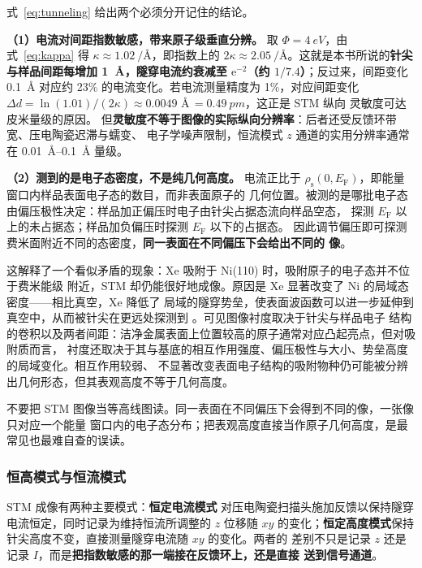 式~\eqref{eq:tunneling} 给出两个必须分开记住的结论。

\textbf{（1）电流对间距指数敏感，带来原子级垂直分辨。} 取 $\Phi=\qty{4}{eV}$，由
式~\eqref{eq:kappa} 得 $\kappa\approx\qty{1.02}{\per\angstrom}$，即指数上的
$2\kappa\approx\qty{2.05}{\per\angstrom}$。这就是本书所说的\textbf{针尖与样品间距每增加
\qty{1}{\angstrom}，隧穿电流约衰减至 $\mathrm{e}^{-2}$（约 $1/7.4$）}；反过来，间距变化
\qty{0.1}{\angstrom} 对应约 23\% 的电流变化。若电流测量精度为 1\%，对应间距变化
$\Delta d=\ln(1.01)/(2\kappa)\approx0.0049$ \AA$\,=\qty{0.49}{pm}$，这正是 STM 纵向
灵敏度可达皮米量级的原因。
但\textbf{灵敏度不等于图像的实际纵向分辨率}：后者还受反馈环带宽、压电陶瓷迟滞与蠕变、
电子学噪声限制，恒流模式 $z$ 通道的实用分辨率通常在 \qtyrange{0.01}{0.1}{\angstrom} 量级。

\textbf{（2）测到的是电子态密度，不是纯几何高度。} 电流正比于
$\rho_{\mathrm{s}}(0,E_{\mathrm{F}})$，即能量窗口内样品表面电子态的数目，而非表面原子的
几何位置。被测的是哪批电子态由偏压极性决定：样品加正偏压时电子由针尖占据态流向样品空态，
探测 $E_{\mathrm{F}}$ 以上的未占据态；样品加负偏压时探测 $E_{\mathrm{F}}$ 以下的占据态。
因此调节偏压即可探测费米面附近不同的态密度，\textbf{同一表面在不同偏压下会给出不同的
像}。

这解释了一个看似矛盾的现象：Xe 吸附于 Ni(110) 时，吸附原子的电子态并不位于费米能级
附近，STM 却仍能很好地成像。原因是 Xe 显著改变了 Ni 的局域态密度——相比真空，Xe 降低了
局域的隧穿势垒，使表面波函数可以进一步延伸到真空中，从而被针尖在更远处探测到
。可见图像衬度取决于针尖与样品电子
结构的卷积以及两者间距：洁净金属表面上位置较高的原子通常对应凸起亮点，但对吸附质而言，
衬度还取决于其与基底的相互作用强度、偏压极性与大小、势垒高度的局域变化。相互作用较弱、
不显著改变表面电子结构的吸附物种仍可能被分辨出几何形态，但其表观高度不等于几何高度。

\begin{pitfall}
不要把 STM 图像当等高线图读。同一表面在不同偏压下会得到不同的像，一张像只对应一个能量
窗口内的电子态分布；把表观高度直接当作原子几何高度，是最常见也最难自查的误读。
\end{pitfall}

\subsubsection{恒高模式与恒流模式}

STM 成像有两种主要模式：\textbf{恒定电流模式}
对压电陶瓷扫描头施加反馈以保持隧穿电流恒定，同时记录为维持恒流所调整的 $z$ 位移随 $xy$
的变化；\textbf{恒定高度模式}保持针尖高度不变，直接测量隧穿电流随 $xy$ 的变化。两者的
差别不只是记录 $z$ 还是记录 $I$，而是\textbf{把指数敏感的那一端接在反馈环上，还是直接
送到信号通道}。

